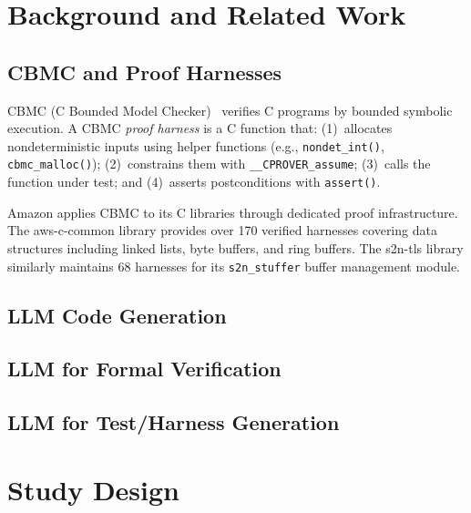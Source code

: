 \documentclass[review]{elsarticle}
\begin{document}
\section{Background and Related Work}
\label{sec:related}

\subsection{CBMC and Proof Harnesses}

CBMC (C Bounded Model Checker)~\cite{cbmc} verifies C programs by
bounded symbolic execution. A CBMC \emph{proof harness} is a C function that:
(1)~allocates nondeterministic inputs using helper functions (e.g.,
\texttt{nondet\_int()}, \texttt{cbmc\_malloc()}); (2)~constrains them with
\texttt{\_\_CPROVER\_assume}; (3)~calls the function under test; and
(4)~asserts postconditions with \texttt{assert()}.

Amazon applies CBMC to its C libraries through dedicated proof infrastructure.
The aws-c-common library provides over 170 verified harnesses covering data
structures including linked lists, byte buffers, and ring buffers.
The s2n-tls library similarly maintains 68 harnesses for its \texttt{s2n\_stuffer}
buffer management module.

\subsection{LLM Code Generation}


\subsection{LLM for Formal Verification}


\subsection{LLM for Test/Harness Generation}


\section{Study Design}
\label{sec:method}
\end{document}
